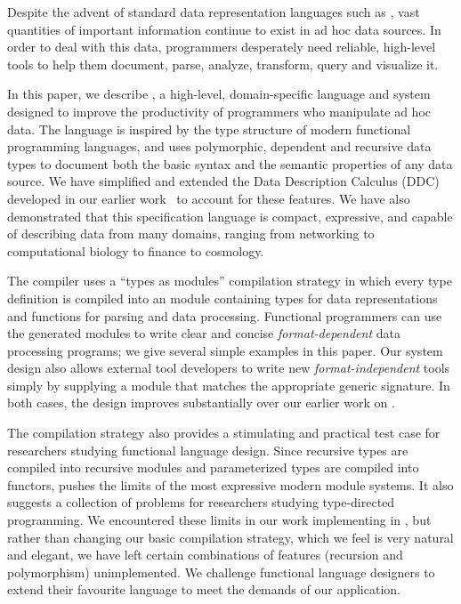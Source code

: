 Despite the advent of standard data representation languages such as
\xml, vast quantities of important information continue to exist
in ad hoc data sources.  In order to deal with this data,
programmers desperately need reliable, high-level tools to 
help them document, parse, 
analyze, transform, query and visualize it.  

In this paper, we describe \padsml{}, 
a high-level, domain-specific language and system
designed to improve the productivity of programmers who 
manipulate ad hoc data.  The \padsml{} 
language is inspired by the type structure of modern functional
programming languages, and uses 
polymorphic, dependent and recursive data types to document both the
basic syntax and the semantic properties of any data source.  
We have simplified and extended the Data Description Calculus (DDC) 
developed in
our earlier work~\cite{fisher+:next700ddl} to account for these features.
We have also demonstrated that this specification language
is compact, expressive, and 
capable of describing data from many domains, ranging from
networking to computational biology to finance to cosmology.

The \padsml{} compiler uses a ``types as modules'' compilation strategy
in which every \padsml{} type definition is compiled into
an \ocaml{} module containing types for data representations
and functions for parsing and data processing.  Functional programmers
can use the generated modules to write clear and concise {\em format-dependent}
data processing programs;
we give several simple examples in this paper.  Our system design
also allows external
tool developers to write new {\em format-independent} tools
simply by supplying a module that matches the appropriate generic
signature.  In both cases, the design improves substantially over
our earlier work on \padsc{}.

The \padsml{} compilation strategy also provides a stimulating and
practical test case for researchers studying functional language
design.  Since recursive types are compiled into recursive modules and
parameterized types are compiled into functors, \padsml{} pushes the
limits of the most expressive modern module systems.  It also suggests
a collection of problems for researchers studying type-directed
programming.  We encountered these limits in our work implementing
\padsml{} in
\ocaml, but rather than changing
our basic compilation strategy, which we feel is very natural and elegant,
we have left certain combinations of features (recursion and polymorphism)
unimplemented.
We challenge functional language designers to extend their favourite
language to meet the demands of our application.


